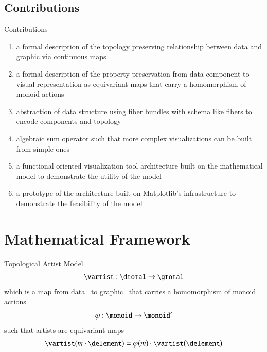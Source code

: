 \documentclass[xcolor={dvipsnames}, handout]{beamer}
\begin{document}
\subsection{Contributions}
\begin{frame}{Contributions}
    \begin{enumerate}
        \item a formal description of the topology preserving relationship between data and graphic via continuous maps
        \item a formal description of the property preservation from data component to visual representation as equivariant maps that carry a homomorphism of monoid actions
        \item abstraction of data structure using fiber bundles with schema like fibers to encode components and topology 
        \item algebraic sum operator such that more complex visualizations can be built from simple ones 
        \item a functional oriented visualization tool architecture built on the mathematical model to demonstrate the utility of the model
        \item a prototype of the architecture built on Matplotlib's infrastructure to demonstrate the feasibility of the model
    \end{enumerate}
\end{frame}

\section{Mathematical Framework}

\begin{frame}{Topological Artist Model}
    \begin{equation}
        \mathscr{\vartist}: \mathscr{\dtotal} \rightarrow \mathscr{\gtotal}
    \end{equation}
    \pause
    which is a map from data \dtotal\ to graphic \gtotal\ that carries a homomorphism of monoid actions 
    \pause 
    \begin{equation}
    \varphi: \monoid \rightarrow \monoid^{\prime}
    \end{equation}
    \pause
    such that artists are equivariant maps 
    \begin{equation}
    \mathscr{\vartist}(m\cdot \delement) = \varphi(m)\cdot\mathscr{\vartist}(\delement) 
    \end{equation}
\end{frame}
\end{document}
